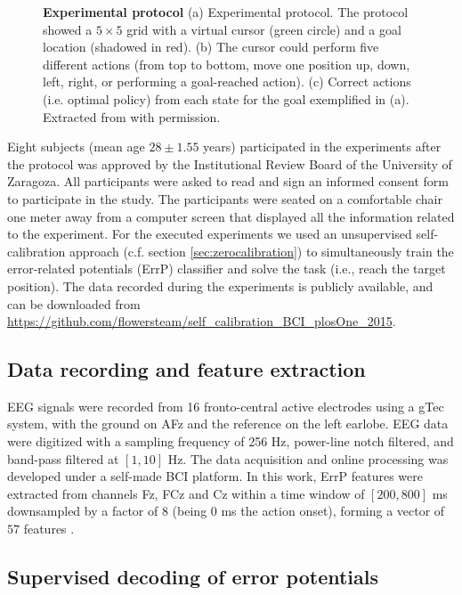 \documentclass[10pt,letterpaper]{article}
\begin{document}
\begin{figure}[!tbp]
	\centering
	\caption{\label{fig:protocol} \textbf{Experimental protocol} (a) Experimental protocol. The protocol showed a $5\times5$ grid with a virtual cursor (green circle) and a goal location (shadowed in red). (b) The cursor could perform five different actions (from top to bottom, move one position up, down, left, right, or performing a goal-reached action). (c) Correct actions (i.e. optimal policy) from each state for the goal exemplified in (a). Extracted from \cite{iturrate13} with permission.}
\end{figure}


Eight subjects (mean age $28 \pm 1.55$ years) participated in the experiments after the protocol was approved by the Institutional Review Board of the University of Zaragoza. All participants were asked to read and sign an informed consent form to participate in the study. The participants were seated on a comfortable chair one meter away from a computer screen that displayed all the information related to the experiment. 
%
For the executed experiments we used an unsupervised self-calibration approach (c.f. section \ref{sec:zerocalibration}) to simultaneously train the error-related potentials (ErrP) \cite{chavarriaga2014errare} classifier  and solve the task (i.e., reach the target position). The data recorded during the experiments is publicly available, and can be downloaded from \url{https://github.com/flowersteam/self_calibration_BCI_plosOne_2015}.

\subsection{Data recording and feature extraction}

EEG signals were recorded from 16 fronto-central active electrodes using a gTec system, with the ground on AFz and the reference on the left earlobe. EEG data were digitized with a sampling frequency of 256 Hz, power-line notch filtered, and band-pass filtered at $[1, 10]$ Hz. The data acquisition and online processing was developed under a self-made BCI platform. 
%
In this work, ErrP features were extracted from channels Fz, FCz and Cz within a time window of $[200,800]$ ms downsampled by a factor of 8 (being 0 ms the action onset), forming a vector of $57$ features \cite{chavarriaga2010learning}. 

\subsection{Supervised decoding of error potentials}
\end{document}
